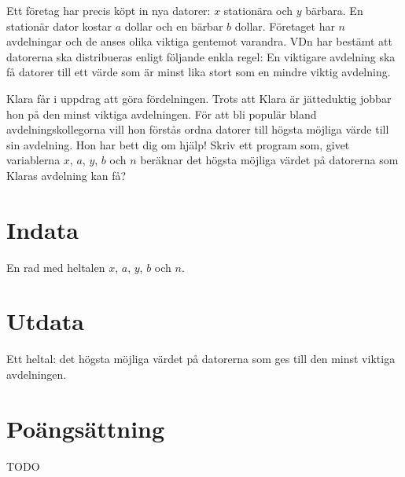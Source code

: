 
Ett företag har precis köpt in nya datorer: $x$ stationära och $y$ bärbara. En stationär dator kostar $a$ dollar och en bärbar $b$ dollar. Företaget har $n$ avdelningar och de anses olika viktiga gentemot varandra. VDn har bestämt att datorerna ska distribueras enligt följande enkla regel: En viktigare avdelning ska få datorer till ett värde som är minst lika stort som en mindre viktig avdelning.

Klara får i uppdrag att göra fördelningen. Trots att Klara är jätteduktig jobbar hon på den minst viktiga avdelningen. För att bli populär bland avdelningskollegorna vill hon förstås ordna datorer till högsta möjliga värde till sin avdelning. Hon har bett dig om hjälp! Skriv ett program som, givet variablerna $x$, $a$, $y$, $b$ och $n$ beräknar det högsta möjliga värdet på datorerna som Klaras avdelning kan få?


\section*{Indata}
En rad med heltalen $x$, $a$, $y$, $b$ och $n$.

\section*{Utdata}

Ett heltal: det högsta möjliga värdet på datorerna som ges till den minst viktiga avdelningen.

\section*{Poängsättning}

TODO
